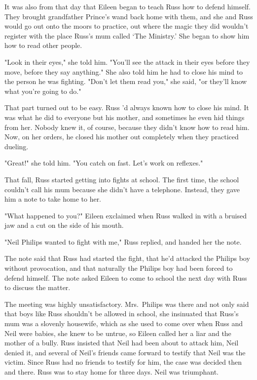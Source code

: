 It was also from that day that Eileen began to teach Russ how to defend himself. They brought grandfather Prince's wand back home with them, and she and Russ would go out onto the moors to practice, out where the magic they did wouldn't register with the place Russ's mum called `The Ministry.' She began to show him how to read other people.

"Look in their eyes," she told him. "You'll see the attack in their eyes before they move, before they say anything." She also told him he had to close his mind to the person he was fighting. "Don't let them read you," she said, "or they'll know what you're going to do."

That part turned out to be easy. Russ 'd always known how to close his mind. It was what he did to everyone but his mother, and sometimes he even hid things from her. Nobody knew it, of course, because they didn't know how to read him. Now, on her orders, he closed his mother out completely when they practiced dueling.

"Great!" she told him. "You catch on fast. Let's work on reflexes."

That fall, Russ started getting into fights at school. The first time, the school couldn't call his mum because she didn't have a telephone. Instead, they gave him a note to take home to her.

"What happened to you?" Eileen exclaimed when Russ walked in with a bruised jaw and a cut on the side of his mouth.

"Neil Philips wanted to fight with me," Russ replied, and handed her the note.

The note said that Russ had started the fight, that he'd attacked the Philips boy without provocation, and that naturally the Philips boy had been forced to defend himself. The note asked Eileen to come to school the next day with Russ to discuss the matter.

The meeting was highly unsatisfactory. Mrs.~Philips was there and not only said that boys like Russ shouldn't be allowed in school, she insinuated that Russ's mum was a slovenly housewife, which as she used to come over when Russ and Neil were babies, she knew to be untrue, so Eileen called her a liar and the mother of a bully. Russ insisted that Neil had been about to attack him, Neil denied it, and several of Neil's friends came forward to testify that Neil was the victim. Since Russ had no friends to testify for him, the case was decided then and there. Russ was to stay home for three days. Neil was triumphant.

